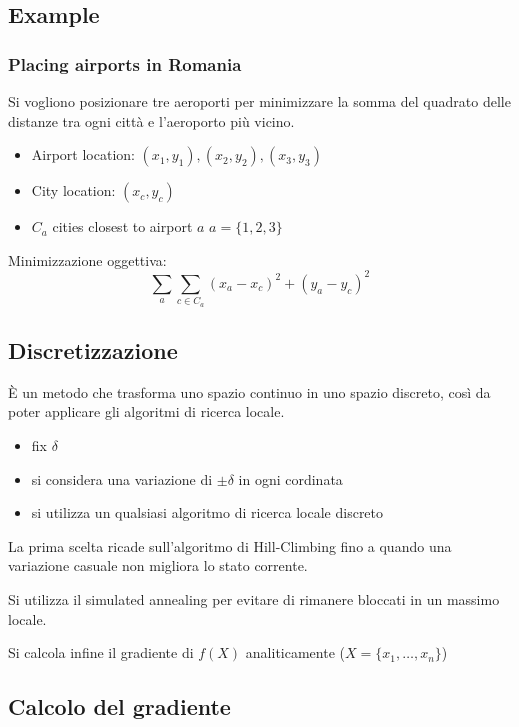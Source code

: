 \documentclass[12pt, a4paper]{article}
\begin{document}
\subsection*{Example}

\subsubsection*{Placing airports in Romania}

Si vogliono posizionare tre aeroporti per minimizzare la somma del quadrato delle distanze tra ogni città e l'aeroporto più vicino.

\begin{itemize}
  \item Airport location: $(x_1, y_1), (x_2, y_2), (x_3, y_3)$
  \item City location: $(x_c, y_c)$
  \item $C_a$ cities closest to airport $a$ $a = \{1,2,3\}$
\end{itemize}

Minimizzazione oggettiva:
$$
\sum_a{\sum_{c\in C_a}(x_a-x_c)^2+(y_a-y_c)^2}
$$

\subsection{Discretizzazione}

È un metodo che trasforma uno spazio continuo in uno spazio discreto, così da poter applicare gli algoritmi di ricerca locale.

\begin{itemize}
  \item fix $\delta$
  \item si considera una variazione di $\pm\delta$ in ogni cordinata
  \item si utilizza un qualsiasi algoritmo di ricerca locale discreto
\end{itemize}

La prima scelta ricade sull'algoritmo di Hill-Climbing fino a quando una variazione casuale non migliora lo stato corrente.

Si utilizza il simulated annealing per evitare di rimanere bloccati in un massimo locale.

Si calcola infine il gradiente di $f(X)$ analiticamente ($X=\{x_1,\dots,x_n\}$)

\subsection{Calcolo del gradiente}
\end{document}
